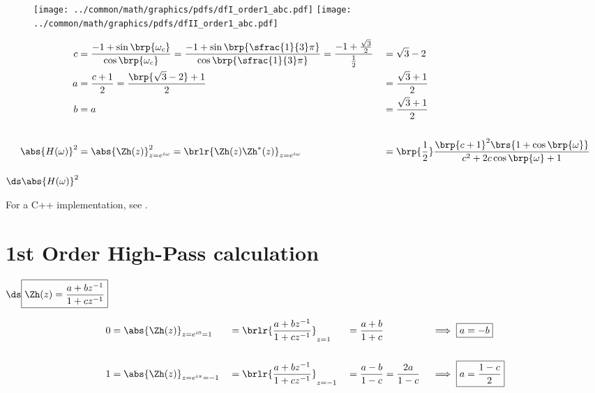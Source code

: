 \begin{figure}
  \centering%
  \texttt{[image: ../common/math/graphics/pdfs/dfI\_order1\_abc.pdf]}
  \texttt{[image: ../common/math/graphics/pdfs/dfII\_order1\_abc.pdf]}
\end{figure}
\begin{example}[order 1 low-pass filter with corner frequency $\omega_c=\frac{2}{3}\pi$]
{ \begin{align*}
  c &= \frac{-1 + \sin\brp{\omega_c}}{\cos\brp{\omega_c}}
     = \frac{-1 + \sin\brp{\sfrac{1}{3}\pi}}{\cos\brp{\sfrac{1}{3}\pi}}
     = \frac{-1 + \frac{\sqrt{3}}{2}}{\frac{1}{2}}
   &&= \sqrt{3} - 2
  \\
  a &= \frac{c+1}{2}
     = \frac{\brp{\sqrt{3} - 2}+1}{2}
   &&= \frac{\sqrt{3}+1}{2}
  \\
  b &= a
   &&= \frac{\sqrt{3} + 1}{2}
  \\
  \\
  \abs{H(\omega)}^2
    &= \abs{\Zh(z)}^2_{z=e^{i\omega}}
     = \brlr{\Zh(z)\Zh^\ast(z)}_{z=e^{i\omega}}
   &&= \brp{\frac{1}{2}}\frac{\brp{c+1}^2\brs{1 +  \cos\brp{\omega}}}
            {c^2 + 2 c\cos\brp{\omega} + 1}
\end{align*}}

$\ds\abs{H(\omega)}^2$
\end{example}


For a C++ implementation, see .

\section{1st Order High-Pass calculation}
$\ds\boxed{ \Zh(z) = \frac{a + bz^{-1}}
                        {1 + cz^{-1}}
          }$

\begin{align*}
  0 &= {\abs{\Zh(z)}}_{z=e^{i0}=1}    
    &&=\brlr{\frac{a + bz^{-1}}{1 + cz^{-1}}}_{z=1} 
    &&=\frac{a + b}{1 + c}                   
    && \implies \boxed{a=-b}
  \\\\
  1 &= \abs{\Zh(z)}_{z=e^{i\pi}=-1} 
   &&= \brlr{\frac{a + bz^{-1}}{1 + cz^{-1}}}_{z=-1} 
   &&= \frac{a - b}{1 - c} = \frac{2a}{1-c}                   
   &&  \implies \boxed{a=\frac{1-c}{2}}
\end{align*}


